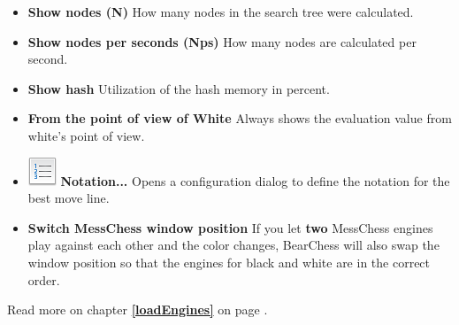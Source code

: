 \documentclass[11pt,a4paper]{article}
\begin{document}
	\begin{itemize}
		\item  \textbf{Show nodes (N)} How many nodes in the search tree were calculated.
		\item \textbf{Show nodes per seconds (Nps)} How many nodes are calculated per second.
		\item \textbf{Show hash} Utilization of the hash memory in percent.
		\item \textbf{From the point of view of White} Always shows the evaluation value from white's point of view.
		\item  \includegraphics[scale=0.5]{text_list_numbers.png} \textbf{Notation...} Opens a configuration dialog to define the notation for the best move line.
		\item \textbf{Switch MessChess window position} If you let \textbf{two} MessChess engines play against each other and the color changes, BearChess will also swap the window position so that the engines for black and white are in the correct order.
	\end{itemize}
	
	Read more on chapter \textbf{\ref{loadEngines}  } on page \pageref{loadEngines}.
	
\end{document}
